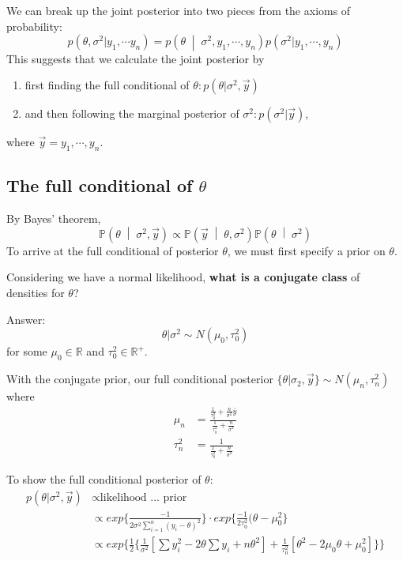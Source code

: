 \documentclass[titlepage, 12pt, leqno]{article}
\begin{document}
We can break up the joint posterior into two pieces from the axioms of 
probability:
\[
p(\theta,\sigma^{2}|y_{1}, \cdots y_{n}) = p\left(\theta
\;\middle|\; \sigma^{2},y_{1}, \cdots , y_{n}\right) p(\sigma^{2}|y_{1}, \cdots ,
y_{n})
\]
This suggests that we calculate the joint posterior by
\begin{enumerate}
    \item first finding the full conditional of $\theta:p(\theta|\sigma^{2}, 
        \vec y)$
    \item and then following the marginal posterior of $\sigma^{2}:p(\sigma^{2}
        |\vec y)$,
\end{enumerate}
where $\vec y = y_{1}, \cdots , y_{n}$.

\subsection{The full conditional of $\theta$}
By Bayes' theorem,
\[
\mathbb{P}\left(\theta \;\middle|\; \sigma^{2},\vec y\right) \propto 
\mathbb{P}\left(\vec y  \;\middle|\; \theta, \sigma^{2}\right) 
\mathbb{P}\left(\theta \;\middle|\; \sigma^{2}\right) 
\]
To arrive at the full conditional of posterior $\theta$, we must first specify
a prior on $\theta$. 
\begin{ex}
    Considering we have a normal likelihood, \textbf{what is a conjugate class}
    of densities for $\theta$?

    \vspace{10px}
    Answer:
    \[
        \theta|\sigma^{2} \sim N(\mu_{0},\tau_{0}^{2})
    \]
    for some $\mu_{0} \in \mathbb{R}$ and $\tau_{0}^{2} \in \mathbb{R}^{+}$.   
\end{ex}

With the conjugate prior, our full conditional posterior $\{\theta|\sigma_{2},
\vec y\} \sim N(\mu_{n}, \tau_{n}^{2})$ where
\begin{align*}
    \mu_{n} &= \frac{\frac{1}{\tau_{0}^{2}}+\frac{n}{\sigma^{2}}\bar y}{
    \frac{1}{\tau_{0}^{2}} + \frac{n}{\sigma^{2}}}\\
        \tau_{n}^{2} &= \frac{1}{\frac{1}{\tau_{0}^{2}} + \frac{n}{\sigma^{2}}}
\end{align*}

To show the full conditional posterior of $\theta$:
\begin{align*}
    p(\theta|\sigma^{2}, \vec y) &\propto \text{likelihood ... prior}\\
                                 &\propto exp\{\frac{-1}{2\sigma^{2}
                                 \sum_{i=1}^{n}(y_{i}-\theta)^{2}}\} \cdot
                                 exp\{\frac{-1}{2\tau_{0}^{2}}(\theta-\mu_{0}^{2}
                                 \}\\
                                 &\propto exp\{\frac{1}{2}\{
                                 \frac{1}{\sigma^{2}}\left[
                                     \sum y_{i}^{2}-2\theta \sum y_{i}+n\theta^{2}
                                 \right] + \frac{1}{\tau_{0}^{2}}\left[\theta^{2}
                         - 2 \mu_{0}\theta + \mu_{0}^{2}\right]\}\}
\end{align*}
\end{document}

